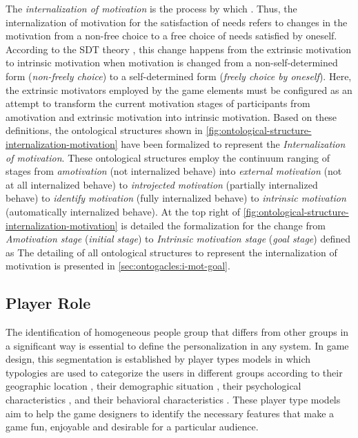 The \emph{internalization of motivation} is the process by which  \cite{GagneDeci2005}.
Thus, the internalization of motivation for the satisfaction of needs refers to changes in the motivation from a non-free choice to a free choice of needs satisfied by oneself.
According to the SDT theory \cite{DeciRyan1985, RyanDeci2000}, this change happens from the extrinsic motivation to intrinsic motivation when motivation is changed from a non-self-determined form (\emph{non-freely choice}) to a self-determined form (\emph{freely choice by oneself}).
Here, the extrinsic motivators employed by the game elements must be configured as an attempt to transform the current motivation stages of participants from amotivation and extrinsic motivation into intrinsic motivation.
Based on these definitions, the ontological structures shown in \autoref{fig:ontological-structure-internalization-motivation} have been formalized to represent the \emph{Internalization of motivation}.
These ontological structures employ the continuum ranging of stages from \emph{amotivation} (not internalized behave) into \emph{external motivation} (not at all internalized behave) to \emph{introjected motivation} (partially internalized behave) to \emph{identify motivation} (fully internalized behave) to \emph{intrinsic motivation} (automatically internalized behave).
At the top right of \autoref{fig:ontological-structure-internalization-motivation} is detailed the formalization for the change from \emph{Amotivation stage} (\emph{initial stage}) to \emph{Intrinsic motivation stage} (\emph{goal stage}) defined as 
The detailing of all ontological structures to represent the internalization of motivation is presented in \autoref{sec:ontogacles:i-mot-goal}.


\subsection{Player Role}
\label{subsec:player-role}

The identification of homogeneous people group that differs from other groups in a significant way is essential to define the personalization in any system.
In game design, this segmentation is established by player types models in which typologies are used to categorize the users in different groups according to their geographic location \cite{BenJuddChrisAvelloneHideoKojimaKeijiInafune2016, ChakrabortyNorcioVeerAndreMillerRegelsberger2015}, their demographic situation \cite{GreenbergSherryLachlanLucasHolmstrom2010, Shaw2012}, their psychological characteristics \cite{Tseng2011, Yee2006}, and their behavioral characteristics \cite{Bartle2004, Lazzaro2009}.
These player type models aim to help the game designers to identify the necessary features that make a game fun, enjoyable and desirable for a particular audience.

